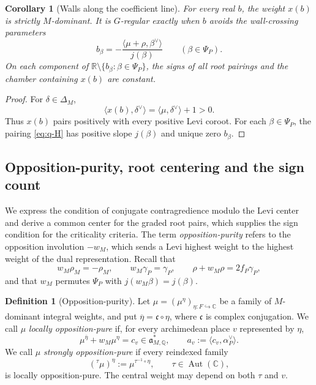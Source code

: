 \documentclass[12pt]{amsart}
\numberwithin{equation}{section}
\theoremstyle{plain}
\newtheorem{corollary}[theorem]{Corollary}
\theoremstyle{definition}
\newtheorem{definition}[theorem]{Definition}
\theoremstyle{remark}
\renewcommand{\bar}{\overline}
\begin{document}
\begin{corollary}[Walls along the coefficient line]\label{cor:shift-walls}
For every real $b$, the weight $x(b)$ is strictly $M$-dominant. It is $G$-regular exactly when $b$ avoids the wall-crossing parameters
\begin{equation}\label{eq:wall-parameters}
 b_\beta=-\frac{\langle\mu+\rho,\beta^\vee\rangle}{j(\beta)}
 \qquad(\beta\in\Psi_P).
\end{equation}
On each component of $\mathbb R\setminus\{b_\beta:\beta\in\Psi_P\}$, the signs of all root pairings and the chamber containing $x(b)$ are constant.
\end{corollary}

\begin{proof}
For $\delta\in\Delta_M$, 
\[\langle x(b),\delta^\vee\rangle =\langle\mu,\delta^\vee\rangle+1>0.\] 
Thus $x(b)$ pairs positively with every positive Levi coroot. For each $\beta\in\Psi_P$, the pairing \eqref{eq:q-H} has positive slope $j(\beta)$ and unique zero $b_\beta$.
\end{proof}

\subsection{Opposition-purity, root centering and the sign count}\label{sec:purity}
We express the condition of conjugate contragredience modulo the Levi center and derive a common center for the graded root pairs, which supplies the sign condition for the criticality criteria. The term \emph{opposition-purity} refers to the opposition involution $-w_M$, which sends a Levi highest weight to the highest weight of the dual representation. Recall that
\[
 w_M\rho_M=-\rho_M,\qquad w_M\gamma_P=\gamma_P,
 \qquad \rho+w_M\rho=2f_P\gamma_P,
\]
and that $w_M$ permutes $\Psi_P$ with $j(w_M\beta)=j(\beta)$.

\begin{definition}[Opposition-purity]\label{def:opposition-purity}
Let $\mu=(\mu^\eta)_{\eta:F\hookrightarrow\mathbb C}$ be a family of $M$-dominant integral weights, and put $\bar\eta=\mathfrak c\circ\eta$, where $\mathfrak c$ is complex conjugation. We call $\mu$ \emph{locally opposition-pure} if, for every archimedean place $v$ represented by $\eta$, 
\begin{equation}\label{eq:local-purity}
 \mu^{\bar\eta}+w_M\mu^\eta=c_v\in\mathfrak a_{M,\mathbb Q}^*,
 \qquad a_v:=\langle c_v,\alpha_P^\vee\rangle.
\end{equation}
We call $\mu$ \emph{strongly opposition-pure} if every reindexed family
\[
 ({}^{\tau}\mu)^\eta:=\mu^{\tau^{-1}\circ\eta},
 \qquad \tau\in\operatorname{Aut}(\mathbb C),
\]
is locally opposition-pure. The central weight may depend on both $\tau$ and $v$.
\end{definition}
\end{document}
